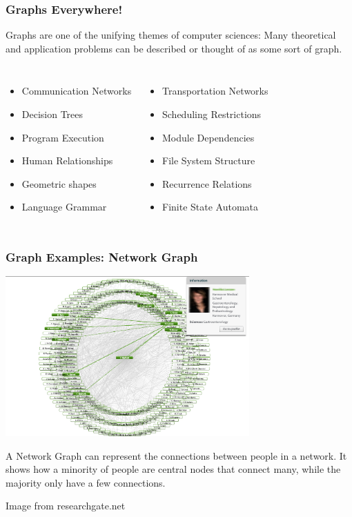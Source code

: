\documentclass{beamer}
\begin{document}
\begin{frame}
  \frametitle{Graphs Everywhere!}
  \begin{block}{}
    Graphs are one of the unifying themes of computer sciences: Many
    theoretical and application problems can be described or thought
    of as some sort of graph.
  \end{block}
  {\small
  \begin{columns}[c]
    \begin{itemize}
    \item Communication Networks
    \item Decision Trees
    \item Program Execution
    \item Human Relationships
    \item Geometric shapes
    \item Language Grammar
    \end{itemize}
    \begin{itemize}
    \item Transportation Networks
    \item Scheduling Restrictions
    \item Module Dependencies
    \item File System Structure
    \item Recurrence Relations
    \item Finite State Automata
    \end{itemize}
  \end{columns}}
\end{frame}

\begin{frame}
  \frametitle{Graph Examples: Network Graph}
  \begin{center}
    \includegraphics[width=0.7\textwidth]{img/networkgraph}
  \end{center}  
  \begin{block}{}
    {\small
    A Network Graph can represent the connections between people in a
    network. It shows how a minority of people are central nodes that
    connect many, while the majority only have a few connections.}
  \end{block}
  \hfill\tiny{Image from researchgate.net}
\end{frame}
\end{document}
